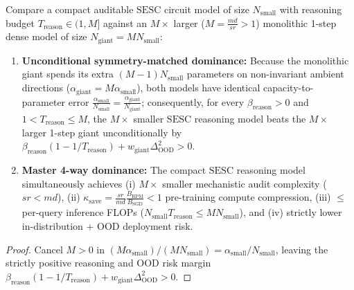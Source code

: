 \begin{lemma}\label{lem:auditable_small_model_dominance}
\leanok
{}
Compare a compact auditable $\mathrm{SESC}$ circuit model of size $N_{\mathrm{small}}$ with reasoning budget $T_{\mathrm{reason}} \in (1, M]$ against an $M\times$ larger ($M = \frac{md}{sr} > 1$) monolithic 1-step dense model of size $N_{\mathrm{giant}} = M N_{\mathrm{small}}$:
\begin{enumerate}
\item \textbf{Unconditional symmetry-matched dominance:} Because the monolithic giant spends its extra $(M-1)N_{\mathrm{small}}$ parameters on non-invariant ambient directions ($\alpha_{\mathrm{giant}} = M\alpha_{\mathrm{small}}$), both models have identical capacity-to-parameter error $\frac{\alpha_{\mathrm{small}}}{N_{\mathrm{small}}} = \frac{\alpha_{\mathrm{giant}}}{N_{\mathrm{giant}}}$; consequently, for every $\beta_{\mathrm{reason}} > 0$ and $1 < T_{\mathrm{reason}} \le M$, the $M\times$ smaller $\mathrm{SESC}$ reasoning model beats the $M\times$ larger 1-step giant unconditionally by $\beta_{\mathrm{reason}}(1 - 1/T_{\mathrm{reason}}) + w_{\mathrm{giant}}\Delta_{\mathrm{OOD}}^2 > 0$.
\item \textbf{Master 4-way dominance:} The compact $\mathrm{SESC}$ reasoning model simultaneously achieves (i) $M\times$ smaller mechanistic audit complexity ($sr < md$), (ii) $\kappa_{\mathrm{save}} = \frac{sr}{md}\frac{B_{\mathrm{RPM}}}{B_{\mathrm{SGD}}} < 1$ pre-training compute compression, (iii) $\le$ per-query inference FLOPs ($N_{\mathrm{small}}T_{\mathrm{reason}} \le M N_{\mathrm{small}}$), and (iv) strictly lower in-distribution + OOD deployment risk.
\end{enumerate}
\end{lemma}
\begin{proof}
\leanok
Cancel $M > 0$ in $(M\alpha_{\mathrm{small}})/(M N_{\mathrm{small}}) = \alpha_{\mathrm{small}}/N_{\mathrm{small}}$, leaving the strictly positive reasoning and OOD risk margin $\beta_{\mathrm{reason}}(1 - 1/T_{\mathrm{reason}}) + w_{\mathrm{giant}}\Delta_{\mathrm{OOD}}^2 > 0$.
\end{proof}

